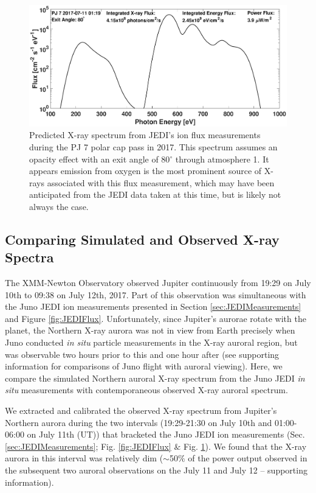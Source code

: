 \documentclass[draft]{agujournal2018}
\begin{document}
\begin{figure}
    \centering
    \includegraphics[width=\textwidth]{Figures/PJ7Spectrum.eps}
    \caption{Predicted X-ray spectrum from JEDI's ion flux measurements during the PJ 7 polar cap pass in 2017. This spectrum assumes an opacity effect with an exit angle of 80$^{\circ}$ through atmosphere 1. It appears emission from oxygen is the most prominent source of X-rays associated with this flux measurement, which may have been anticipated from the JEDI data taken at this time, but is likely  not always the case.}
    \label{fig:JEDISpec}
\end{figure}

\subsection{Comparing Simulated and Observed X-ray Spectra}

The XMM-Newton Observatory observed Jupiter continuously from 19:29 on July 10th to 09:38 on July 12th, 2017.
Part of this observation was simultaneous with the Juno JEDI ion measurements presented in Section \ref{sec:JEDIMeasurements} and Figure \ref{fig:JEDIFlux}.
Unfortunately, since Jupiter’s aurorae rotate with the planet, the Northern X-ray aurora was not in view from Earth precisely when Juno conducted \textit{in situ} particle measurements in the X-ray auroral region, but was observable two hours prior to this and one hour after (see supporting information for comparisons of Juno flight with auroral viewing).
Here, we compare the simulated Northern auroral X-ray spectrum from the Juno JEDI \textit{in situ} measurements with contemporaneous observed X-ray auroral spectrum.

We extracted and calibrated the observed X-ray spectrum from Jupiter’s Northern aurora during the two intervals (19:29-21:30 on July 10th and 01:00-06:00 on July 11th (UT)) that bracketed the Juno JEDI ion measurements (Sec. \ref{sec:JEDIMeasurements}; Fig. \ref{fig:JEDIFlux} $\&$ Fig. \ref{fig:JEDISpec}).
We found that the X-ray aurora in this interval was relatively dim ($\sim$50$\%$ of the power output observed in the subsequent two auroral observations on the July 11 and July 12 – supporting information).
\end{document}
